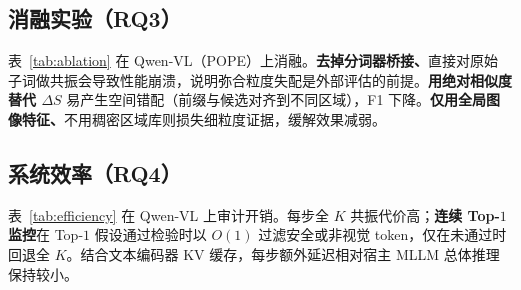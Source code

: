\subsection{消融实验（RQ3）}

表~\ref{tab:ablation} 在 Qwen-VL（POPE）上消融。\textbf{去掉分词器桥接、}直接对原始子词做共振会导致性能崩溃，说明弥合粒度失配是外部评估的前提。\textbf{用绝对相似度替代 $\Delta S$} 易产生空间错配（前缀与候选对齐到不同区域），F1 下降。\textbf{仅用全局图像特征、}不用稠密区域库则损失细粒度证据，缓解效果减弱。

\subsection{系统效率（RQ4）}

表~\ref{tab:efficiency} 在 Qwen-VL 上审计开销。每步全 $K$ 共振代价高；\textbf{连续 Top-$1$ 监控}在 Top-$1$ 假设通过检验时以 $O(1)$ 过滤安全或非视觉 token，仅在未通过时回退全 $K$。结合文本编码器 KV 缓存，每步额外延迟相对宿主 MLLM 总体推理保持较小。
